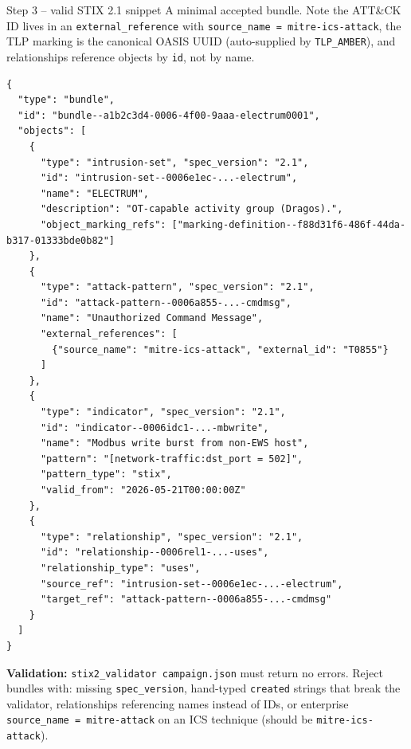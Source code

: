 \documentclass[11pt,a4paper]{article}
\begin{document}
\begin{solutionbox}{Step 3 -- valid STIX 2.1 snippet}
A minimal accepted bundle. Note the ATT\&CK ID lives in an
\texttt{external\_reference} with \texttt{source\_name = mitre-ics-attack}, the
TLP marking is the canonical OASIS UUID (auto-supplied by \texttt{TLP\_AMBER}),
and relationships reference objects by \texttt{id}, not by name.

\begin{lstlisting}[]
{
  "type": "bundle",
  "id": "bundle--a1b2c3d4-0006-4f00-9aaa-electrum0001",
  "objects": [
    {
      "type": "intrusion-set", "spec_version": "2.1",
      "id": "intrusion-set--0006e1ec-...-electrum",
      "name": "ELECTRUM",
      "description": "OT-capable activity group (Dragos).",
      "object_marking_refs": ["marking-definition--f88d31f6-486f-44da-b317-01333bde0b82"]
    },
    {
      "type": "attack-pattern", "spec_version": "2.1",
      "id": "attack-pattern--0006a855-...-cmdmsg",
      "name": "Unauthorized Command Message",
      "external_references": [
        {"source_name": "mitre-ics-attack", "external_id": "T0855"}
      ]
    },
    {
      "type": "indicator", "spec_version": "2.1",
      "id": "indicator--0006idc1-...-mbwrite",
      "name": "Modbus write burst from non-EWS host",
      "pattern": "[network-traffic:dst_port = 502]",
      "pattern_type": "stix",
      "valid_from": "2026-05-21T00:00:00Z"
    },
    {
      "type": "relationship", "spec_version": "2.1",
      "id": "relationship--0006rel1-...-uses",
      "relationship_type": "uses",
      "source_ref": "intrusion-set--0006e1ec-...-electrum",
      "target_ref": "attack-pattern--0006a855-...-cmdmsg"
    }
  ]
}
\end{lstlisting}

\textbf{Validation:} \texttt{stix2\_validator campaign.json} must return no
errors. Reject bundles with: missing \texttt{spec\_version}, hand-typed
\texttt{created} strings that break the validator, relationships referencing
names instead of IDs, or enterprise \texttt{source\_name = mitre-attack} on an
ICS technique (should be \texttt{mitre-ics-attack}).
\end{solutionbox}
\end{document}
